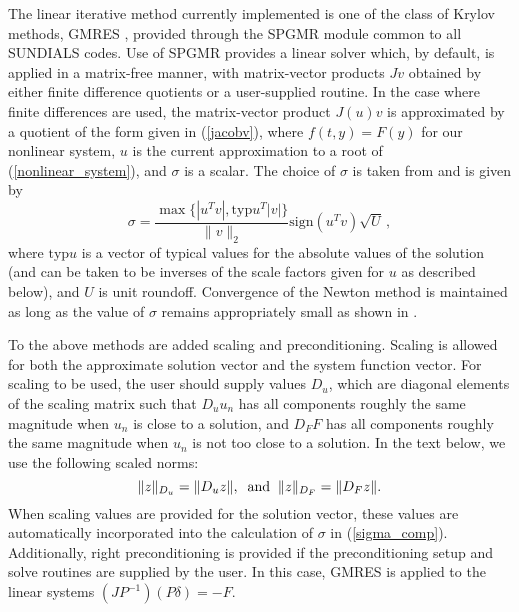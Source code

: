 The linear iterative method currently implemented is one of the class of 
Krylov methods, GMRES \cite{BrHi:89,SaSc:86}, 
provided through the SPGMR module common to all SUNDIALS codes. 
Use of SPGMR provides a linear solver which, by default, is applied in a 
matrix-free manner, with matrix-vector products $Jv$ obtained by either 
finite difference quotients or a user-supplied routine.
In the case where finite differences are used, 
the matrix-vector product $J(u)v$ is approximated by a quotient of the form
given in (\ref{jacobv}),
where $f(t, y) = F(y)$ for our nonlinear system, 
$u$ is the current approximation to a root of (\ref{nonlinear_system}), 
and $\sigma$ is a scalar.  The choice of $\sigma$ is taken from 
\cite{BrSa:90} and is given by
\begin{equation}\label{sigma_comp}
  \sigma = \frac{\max \{|u^T v|, \mbox{typ}u^T |v|\}}{\|v\|_2} 
  \mbox{sign}(u^T v) \sqrt{U} \, ,
\end{equation}
where $\mbox{typ}u$ is a vector of typical values for the absolute
values of the solution (and can be taken to be inverses of the scale
factors given for $u$ as described below), and $U$ is unit roundoff.
Convergence of the Newton method is maintained as long as the value of
$\sigma$ remains appropriately small as shown in \cite{Bro:87}.

To the above methods are added scaling and preconditioning. Scaling is allowed
for both the approximate solution vector and the system function vector.
For scaling to be used, the user should supply values $D_u$, which
are diagonal elements of the scaling matrix such that $D_u u_n$ has all
components roughly the same magnitude when $u_n$ is close to a solution,
and $D_F F$ has all components roughly the same magnitude when $u_n$ is not
too close to a solution.
In the text below, we use the following scaled norms:
\begin{equation}
\|z\|_{D_u} = \|D_u z\|, \;\; {\rm and} \;\; \|z\|_{D_F} = \|D_F z\|.
\end{equation}
When scaling values are provided for the solution vector, these values are 
automatically incorporated into the calculation of $\sigma$ in
(\ref{sigma_comp}).
Additionally, right preconditioning is provided if the preconditioning 
setup and solve routines are supplied by the user.  In this case,
GMRES is applied to the linear systems $(JP^{-1})(P\delta) = -F$.

